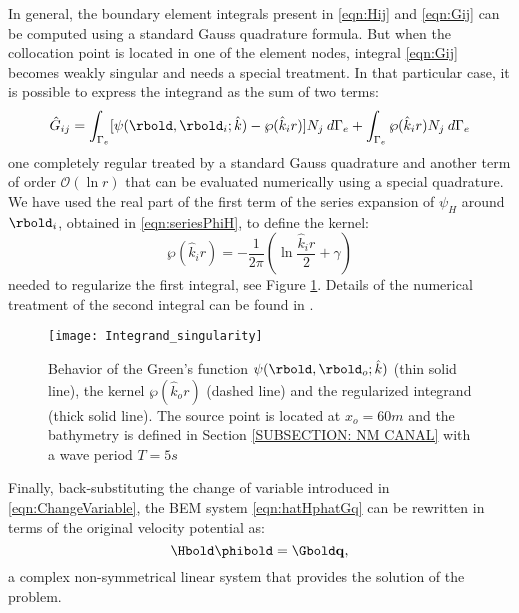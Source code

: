 In general, the boundary element integrals present in \eqref{eqn:Hij} and \eqref{eqn:Gij} can be computed using a standard Gauss quadrature formula. But when the collocation point is located in one of the element nodes, integral \eqref{eqn:Gij} becomes weakly singular and needs a special treatment. In that particular case, it is possible to express the integrand as the sum of two terms:
\begin{equation}
\hat{G}_{ij} = \int_{\Gamma_{e}}  [ \psi(\rbold,\rbold_i;\hat{k}) - \wp(\hat{k}_i r) ] N_{j} \:d\Gamma_{e} + \int_{\Gamma_{e}} \wp(\hat{k}_i r) N_{j} \:d\Gamma_{e}
\label{eqn:GijRegular}
\end{equation}
one completely regular treated by a standard Gauss quadrature and another term of order $\mathcal{O}(\ln r)$ that can be evaluated numerically using a special quadrature. We have used the real part of the first term of the series expansion of $\psi_H$ around $\rbold_i$, obtained in \eqref{eqn:seriesPhiH}, to define the kernel:
\begin{equation}
\wp(\hat{k}_i r) = -\frac{1}{2\pi} (\ln\frac{\hat{k}_i r}{2}+\gamma)
\label{eqn:fRegular}
\end{equation}
needed to regularize the first integral, see Figure \ref{fig: el phase field}. Details of the numerical treatment of the second integral can be found in \cite{Dominguez1993}.

\begin{figure}
\centering
\texttt{[image: Integrand\_singularity]}
\caption{Behavior of the Green's function $\psi(\rbold,\rbold_o;\hat{k})$ (thin solid line), the kernel $\wp(\hat{k}_o r)$ (dashed line) and the regularized integrand (thick solid line). The source point is located at $x_o=60m$ and the bathymetry is defined in Section \ref{SUBSECTION: NM CANAL} with a wave period $T=5s$}
\label{fig: el phase field}
\end{figure}

Finally, back-substituting the change of variable introduced in \eqref{eqn:ChangeVariable}, the BEM system \eqref{eqn:hatHphatGq} can be rewritten in terms of the original velocity potential as:
% 
\begin{equation}
\label{eqn:HpGq}
\Hbold \phibold = \Gbold \bold{q},
\end{equation}
%
a complex non-symmetrical linear system that provides the solution of the problem.

